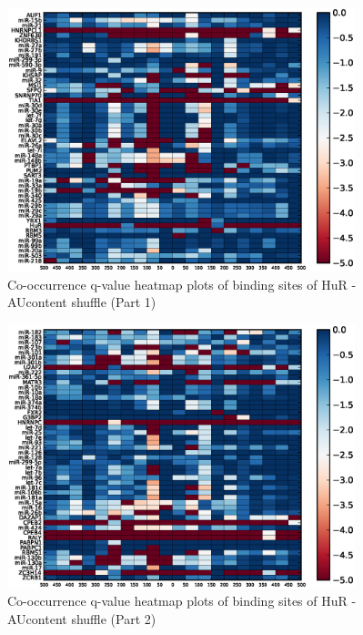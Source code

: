 \begin{figure}
   	\includegraphics[width=0.9\textwidth]{appendix1/figures/HuR_AUcontent_expressed_heatmap_qvalues0.eps}
   	\caption{Co-occurrence q-value heatmap plots of binding sites of HuR - AUcontent shuffle (Part 1)}
\end{figure}
\clearpage
\begin{figure}
   	\includegraphics[width=0.9\textwidth]{appendix1/figures/HuR_AUcontent_expressed_heatmap_qvalues1.eps}
   	\caption{Co-occurrence q-value heatmap plots of binding sites of HuR - AUcontent shuffle (Part 2)}
\end{figure}

